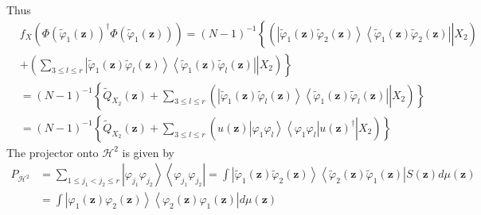 \documentclass[aps,preprint]{revtex4}%
\begin{document}
Thus
\begin{align}
&  f_{X}\left(  \Phi\left(  \tilde{\varphi}_{1}\left(  \mathbf{z}\right)
\right)  ^{\dagger}\Phi\left(  \tilde{\varphi}_{1}\left(  \mathbf{z}\right)
\right)  \right)  =\left(  N-1\right)  ^{-1}\left\{  \left(  \left.
\overset{}{\left\vert \tilde{\varphi}_{1}\left(  \mathbf{z}\right)
\tilde{\varphi}_{2}\left(  \mathbf{z}\right)  \right\rangle \left\langle
\tilde{\varphi}_{1}\left(  \mathbf{z}\right)  \tilde{\varphi}_{2}\left(
\mathbf{z}\right)  \right\vert }\right\vert X_{2}\right)  \right. \nonumber\\
&  \left.  +\left(  \left.  \sum_{3\leq l\leq r}\left\vert \tilde{\varphi}%
_{1}\left(  \mathbf{z}\right)  \tilde{\varphi}_{l}\left(  \mathbf{z}\right)
\right\rangle \left\langle \tilde{\varphi}_{1}\left(  \mathbf{z}\right)
\tilde{\varphi}_{l}\left(  \mathbf{z}\right)  \right\vert \right\vert
X_{2}\right)  \right\} \nonumber\\
&  =\left(  N-1\right)  ^{-1}\left\{  \tilde{Q}_{X_{2}}\left(  \mathbf{z}%
\right)  +\sum_{3\leq l\leq r}\left(  \left.  \overset{}{\left\vert
\tilde{\varphi}_{1}\left(  \mathbf{z}\right)  \tilde{\varphi}_{l}\left(
\mathbf{z}\right)  \right\rangle \left\langle \tilde{\varphi}_{1}\left(
\mathbf{z}\right)  \tilde{\varphi}_{l}\left(  \mathbf{z}\right)  \right\vert
}\right\vert X_{2}\right)  \right\} \nonumber\\
&  =\left(  N-1\right)  ^{-1}\left\{  \tilde{Q}_{X_{2}}\left(  \mathbf{z}%
\right)  +\sum_{3\leq l\leq r}\left(  \left.  \overset{}{u\left(
\mathbf{z}\right)  \left\vert \varphi_{1}\varphi_{l}\right\rangle \left\langle
\varphi_{1}\varphi_{l}\right\vert u\left(  \mathbf{z}\right)  ^{\dagger}%
}\right\vert X_{2}\right)  \right\}
\end{align}
The projector onto $\mathcal{H}^{2}$ is given by
\begin{align}
P_{\mathcal{H}^{2}}  &  =\sum_{1\leq j_{1}<j_{2}\leq r}\left\vert
\varphi_{j_{1}}\varphi_{j_{2}}\right\rangle \left\langle \varphi_{j_{1}%
}\varphi_{j_{2}}\right\vert =\int\left\vert \tilde{\varphi}_{1}\left(
\mathbf{z}\right)  \tilde{\varphi}_{2}\left(  \mathbf{z}\right)  \right\rangle
\left\langle \tilde{\varphi}_{2}\left(  \mathbf{z}\right)  \tilde{\varphi}%
_{1}\left(  \mathbf{z}\right)  \right\vert S\left(  \mathbf{z}\right)
d\mu\left(  \mathbf{z}\right) \\
&  =\int\left\vert \varphi_{1}\left(  \mathbf{z}\right)  \varphi_{2}\left(
\mathbf{z}\right)  \right\rangle \left\langle \varphi_{2}\left(
\mathbf{z}\right)  \varphi_{1}\left(  \mathbf{z}\right)  \right\vert
d\mu\left(  \mathbf{z}\right)
\end{align}
\end{document}
